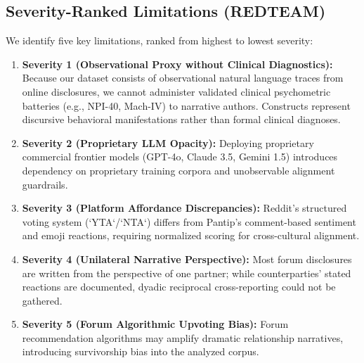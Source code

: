 \subsection{Severity-Ranked Limitations (REDTEAM)}
We identify five key limitations, ranked from highest to lowest severity:
\begin{enumerate}[leftmargin=*]
    \item \textbf{Severity 1 (Observational Proxy without Clinical Diagnostics):} Because our dataset consists of observational natural language traces from online disclosures, we cannot administer validated clinical psychometric batteries (e.g., NPI-40, Mach-IV) to narrative authors. Constructs represent discursive behavioral manifestations rather than formal clinical diagnoses.
    \item \textbf{Severity 2 (Proprietary LLM Opacity):} Deploying proprietary commercial frontier models (GPT-4o, Claude 3.5, Gemini 1.5) introduces dependency on proprietary training corpora and unobservable alignment guardrails.
    \item \textbf{Severity 3 (Platform Affordance Discrepancies):} Reddit's structured voting system (`YTA`/`NTA`) differs from Pantip's comment-based sentiment and emoji reactions, requiring normalized scoring for cross-cultural alignment.
    \item \textbf{Severity 4 (Unilateral Narrative Perspective):} Most forum disclosures are written from the perspective of one partner; while counterparties' stated reactions are documented, dyadic reciprocal cross-reporting could not be gathered.
    \item \textbf{Severity 5 (Forum Algorithmic Upvoting Bias):} Forum recommendation algorithms may amplify dramatic relationship narratives, introducing survivorship bias into the analyzed corpus.
\end{enumerate}

